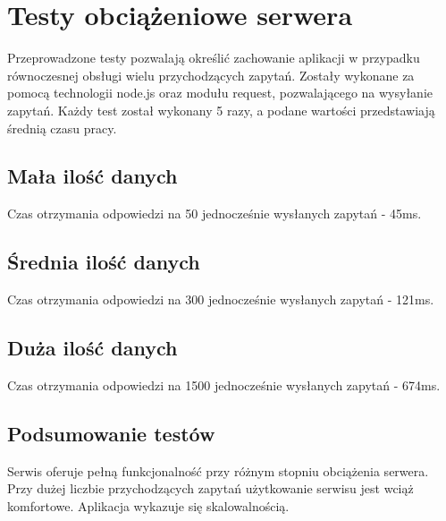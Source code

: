\documentclass[12pt]{report}
\begin{document}
\section{Testy obciążeniowe serwera}
Przeprowadzone testy pozwalają określić zachowanie aplikacji w przypadku równoczesnej obsługi wielu przychodzących zapytań. Zostały wykonane za pomocą technologii node.js oraz modułu request, pozwalającego na wysyłanie zapytań. Każdy test został wykonany 5 razy, a podane wartości przedstawiają średnią czasu pracy.

\subsection{Mała ilość danych}
Czas otrzymania odpowiedzi na 50 jednocześnie wysłanych zapytań - 45ms.

\subsection{Średnia ilość danych}
Czas otrzymania odpowiedzi na 300 jednocześnie wysłanych zapytań - 121ms.

\subsection{Duża ilość danych}
Czas otrzymania odpowiedzi na 1500 jednocześnie wysłanych zapytań - 674ms.

\subsection{Podsumowanie testów}
Serwis oferuje pełną funkcjonalność przy różnym stopniu obciążenia serwera. Przy dużej liczbie przychodzących zapytań użytkowanie serwisu jest wciąż komfortowe. Aplikacja wykazuje się skalowalnością.
\end{document}
